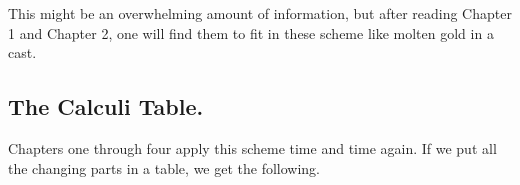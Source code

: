 This might be an overwhelming amount of information, but after reading Chapter 1 and Chapter 2, one will find them to fit in these scheme like molten gold in a cast.

\subsection{The Calculi Table.}

Chapters one through four apply this scheme time and time again. If we put all the changing parts in a table, we get the following.

\bgroup
\begin{table}[H]
\centering
\captionsetup{labelformat=empty}
\caption{(Table 1) The Calculi Table.}
\def\arraystretch{2}

\end{table}
